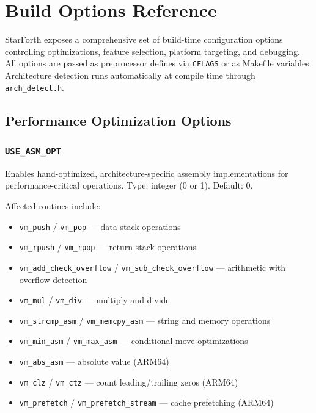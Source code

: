 
\section{Build Options Reference}
\label{sec:build-options}

StarForth exposes a comprehensive set of build-time configuration options
controlling optimizations, feature selection, platform targeting, and
debugging. All options are passed as preprocessor defines via \texttt{CFLAGS}
or as Makefile variables. Architecture detection runs automatically at compile
time through \texttt{arch\_detect.h}.

\subsection{Performance Optimization Options}
\label{sec:build-perf}

\subsubsection{\texttt{USE\_ASM\_OPT}}

Enables hand-optimized, architecture-specific assembly implementations for
performance-critical operations. Type: integer (0 or 1). Default: 0.

Affected routines include:

\begin{itemize}
  \item \texttt{vm\_push} / \texttt{vm\_pop} — data stack operations
  \item \texttt{vm\_rpush} / \texttt{vm\_rpop} — return stack operations
  \item \texttt{vm\_add\_check\_overflow} / \texttt{vm\_sub\_check\_overflow} — arithmetic with overflow detection
  \item \texttt{vm\_mul} / \texttt{vm\_div} — multiply and divide
  \item \texttt{vm\_strcmp\_asm} / \texttt{vm\_memcpy\_asm} — string and memory operations
  \item \texttt{vm\_min\_asm} / \texttt{vm\_max\_asm} — conditional-move optimizations
  \item \texttt{vm\_abs\_asm} — absolute value (ARM64)
  \item \texttt{vm\_clz} / \texttt{vm\_ctz} — count leading/trailing zeros (ARM64)
  \item \texttt{vm\_prefetch} / \texttt{vm\_prefetch\_stream} — cache prefetching (ARM64)
\end{itemize}

